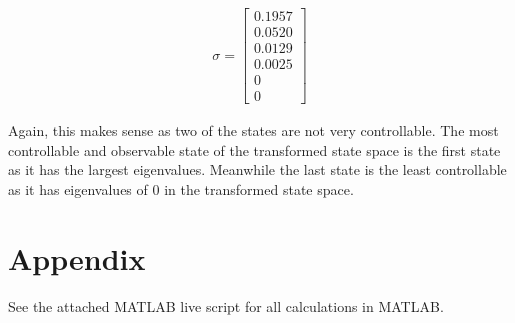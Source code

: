 \documentclass{article}
\begin{document}
    \begin{align}
        \sigma = \begin{bmatrix} 0.1957 \\ 0.0520 \\ 0.0129 \\ 0.0025 \\ 0 \\ 0 \end{bmatrix}
    \end{align}

    Again, this makes sense as two of the states are not very controllable.
    The most controllable and observable state of the transformed state space is the first state
    as it has the largest eigenvalues.
    Meanwhile the last state is the least controllable as it has eigenvalues of 0 in the transformed state space.

    \section{Appendix}\label{sec:appendix}

    See the attached MATLAB live script for all calculations in MATLAB.
\end{document}
